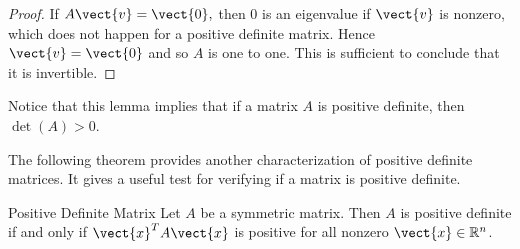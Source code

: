 \begin{proof}
If $A\vect{v}=\vect{0},$ then $0$ is an eigenvalue if $\vect{v}$ is nonzero, which
does not happen for a positive definite matrix. Hence $\vect{v}=\vect{0}$ and
so $A$ is one to one. This is sufficient to conclude that it is invertible.
\end{proof}

Notice that this lemma implies that if a matrix $A$ is positive definite, then $\det(A) > 0$. 

The following theorem provides another characterization of positive definite matrices. It gives a useful test for verifying if a matrix is positive definite. 

\begin{theorem}{Positive Definite Matrix}\label{thm:positivedefinite}
Let $A$ be a symmetric matrix. Then $A$ is positive definite if and
only if $\vect{x}^T A \vect{x} $ is positive for all nonzero $\vect{x}
\in \mathbb{R}^n$.
\end{theorem}

